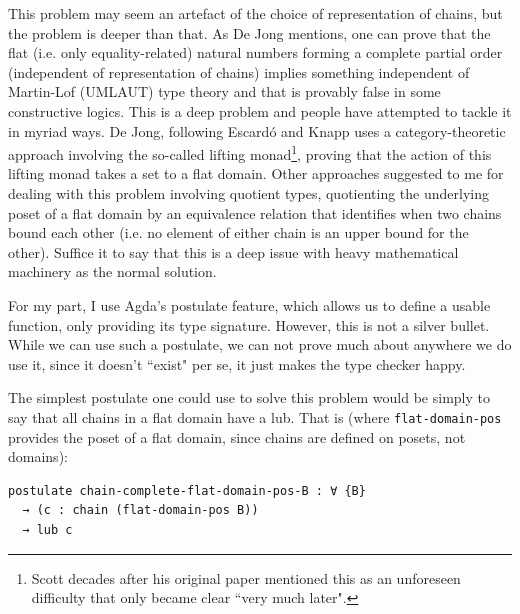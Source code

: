 \documentclass[12pt,a4paper,twoside,openright]{report}
\begin{document}
This problem may seem an artefact of the choice of representation of chains, but the problem is deeper than that. As De Jong \cite{De-Jong} mentions, one can prove that the flat (i.e. only equality-related) natural numbers forming a complete partial order (independent of representation of chains) implies something independent of Martin-Lof (UMLAUT) type theory and that is provably false in some constructive logics. This is a deep problem and people have attempted to tackle it in myriad ways. De Jong, following Escardó and Knapp \cite{Escardo} uses a category-theoretic approach involving the so-called lifting monad\footnote{Scott decades after his original paper mentioned this as an unforeseen difficulty that only became clear ``very much later".}, proving that the action of this lifting monad takes a set to a flat domain. Other approaches suggested to me for dealing with this problem involving quotient types, quotienting the underlying poset of a flat domain by an equivalence relation that identifies when two chains bound each other (i.e. no element of either chain is an upper bound for the other). Suffice it to say that this is a deep issue with heavy mathematical machinery as the normal solution. 


For my part, I use Agda's postulate feature, which allows us to define a usable function, only providing its type signature. However, this is not a silver bullet. While we can use such a postulate, we can not prove much about anywhere we do use it, since it doesn't ``exist" per se, it just makes the type checker happy. 

The simplest postulate one could use to solve this problem would be simply to say that all chains in a flat domain have a lub. That is (where \texttt{flat-domain-pos} provides the poset of a flat domain, since chains are defined on posets, not domains):
\begin{verbatim}
postulate chain-complete-flat-domain-pos-B : ∀ {B} 
  → (c : chain (flat-domain-pos B)) 
  → lub c
\end{verbatim}
\end{document}
